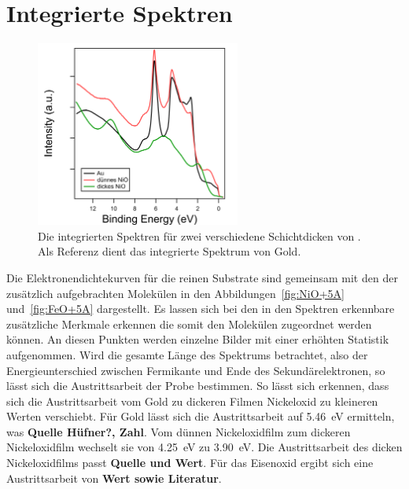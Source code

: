     \section{Integrierte Spektren}
    \label{sec:EDC}
        \begin{figure}
            \centering
            \includegraphics[width=0.6\textwidth]{./content/NiO_Filmdicke}
            \caption{Die integrierten Spektren für zwei verschiedene Schichtdicken von . Als Referenz dient das integrierte Spektrum von Gold.}
            \label{fig:NiO_Filmdicke}
        \end{figure}
        Die Elektronendichtekurven für die reinen Substrate sind gemeinsam mit den der zusätzlich aufgebrachten Molekülen in den Abbildungen~\ref{fig:NiO+5A} und~\ref{fig:FeO+5A} dargestellt.
        Es lassen sich bei den in den Spektren erkennbare zusätzliche Merkmale erkennen die somit den Molekülen zugeordnet werden können.
        An diesen Punkten werden einzelne Bilder mit einer erhöhten Statistik aufgenommen.
        Wird die gesamte Länge des Spektrums betrachtet, also der Energieunterschied zwischen Fermikante und Ende des Sekundärelektronen, so lässt sich die Austrittsarbeit der Probe bestimmen.
        So lässt sich erkennen, dass sich die Austrittsarbeit vom Gold zu dickeren Filmen Nickeloxid zu kleineren Werten verschiebt.
        Für Gold lässt sich die Austrittsarbeit auf \SI{5.46}{\electronvolt} ermitteln, was \textbf{Quelle Hüfner?, Zahl}.
        Vom dünnen Nickeloxidfilm zum dickeren Nickeloxidfilm wechselt sie von \SI{4.25}{\electronvolt} zu \SI{3.90}{\electronvolt}.
        Die Austrittsarbeit des dicken Nickeloxidfilms passt \textbf{Quelle und Wert}.
        Für das Eisenoxid ergibt sich eine Austrittsarbeit von \textbf{Wert sowie Literatur}.

